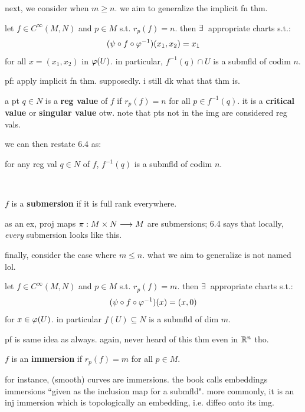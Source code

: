 next, we consider when $m\geq n$. we aim to generalize the implicit fn thm.
\begin{thm}[title=this has many names]
	let $f\in C^{\infty}(M,N)$ and $p\in M$ s.t. $r_{p}(f)=n$.
	then $\ex$ appropriate charts s.t.:
	\begin{equation*}
		(\psi\circ f\circ\varphi^{-1})(x_{1},x_{2})=x_{1}
	\end{equation*}
	for all $x=(x_{1},x_{2})$ in $\varphi(U)$.
	in particular, $f^{-1}(q)\cap U$ is a submfld of codim $n$.
\end{thm}
pf: apply implicit fn thm. supposedly. i still dk what that thm is.

\begin{defn}
	a pt $q\in N$ is a \textbf{reg value} of $f$ if $r_{p}(f)=n$ for all $p\in f^{-1}(q)$.
	it is a \textbf{critical value} or \textbf{singular value} otw.
	note that pts not in the img are considered reg vals.
\end{defn}
we can then restate 6.4 as:
\begin{thm}
	for any reg val $q\in N$ of $f$, $f^{-1}(q)$ is a submfld of codim $n$.
\end{thm} \

\begin{defn}
	$f$ is a \textbf{submersion} if it is full rank everywhere.
\end{defn}
as an ex, proj maps $\pi:M\times N\longrightarrow M$ are submersions; 6.4 says that locally,
\textit{every} submersion looks like this.

finally, consider the case where $m\leq n$.
what we aim to generalize is not named lol.
\begin{thm}[title=Normal Form for Immersions (supposedly)]
	let $f\in C^{\infty}(M,N)$ and $p\in M$ s.t. $r_{p}(f)=m$.
	then $\ex$ appropriate charts s.t.:
	\begin{equation*}
		(\psi\circ f\circ\varphi^{-1})(x)=(x,0)
	\end{equation*}
	for $x\in\varphi(U)$. in particular $f(U)\subseteq N$ is a submfld of dim $m$.
\end{thm}
pf is same idea as always. again, never heard of this thm even in $\mathbb{R}^{n}$ tho.

\begin{defn}
	$f$ is an \textbf{immersion} if $r_{p}(f)=m$ for all $p\in M$.
\end{defn}
for instance, (smooth) curves are immersions.
the book calls embeddings immersions ``given as the inclusion map for a submfld".
more commonly, it is an inj immersion which is topologically an embedding, i.e. diffeo onto its img.

